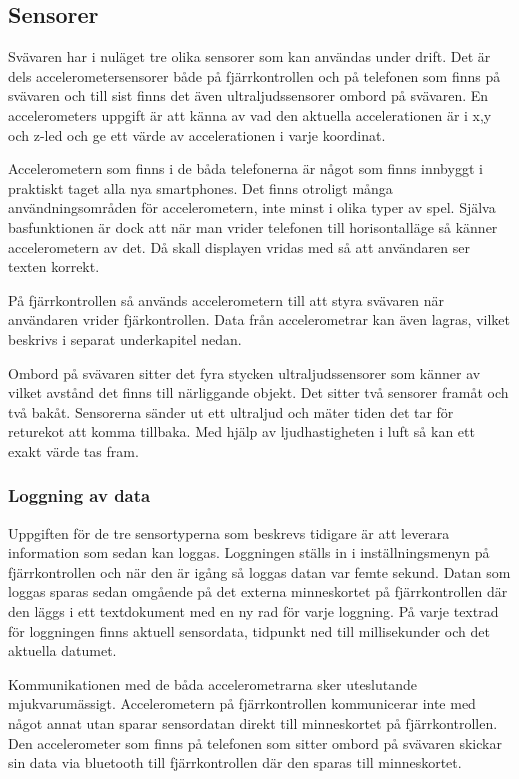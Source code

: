 \subsection{Sensorer}
Svävaren har i nuläget tre olika sensorer som kan användas under drift. Det är dels accelerometersensorer både 
på fjärrkontrollen och på telefonen som finns på svävaren och till sist finns det även ultraljudssensorer ombord på 
svävaren. En accelerometers uppgift är att känna av vad den aktuella accelerationen är i x,y och z-led och ge ett värde 
av accelerationen i varje koordinat.

Accelerometern som finns i de båda telefonerna är något som finns innbyggt i praktiskt taget alla nya smartphones. 
Det finns otroligt många användningsområden för accelerometern, inte minst i olika typer av spel. 
Själva basfunktionen är dock att när man vrider telefonen till horisontalläge så känner accelerometern av det. 
Då skall displayen vridas med så att användaren ser texten korrekt.

På fjärrkontrollen så används accelerometern till att styra svävaren när
användaren vrider fjärkontrollen.
Data från accelerometrar kan även lagras, vilket beskrivs i separat
underkapitel nedan.

Ombord på svävaren sitter det fyra stycken ultraljudssensorer som känner av vilket avstånd det finns till närliggande 
objekt. Det sitter två sensorer framåt och två bakåt. Sensorerna sänder ut ett ultraljud och mäter tiden det tar för 
returekot att komma tillbaka. Med hjälp av ljudhastigheten i luft så kan ett exakt värde tas fram.

\subsubsection{Loggning av data}
Uppgiften för de tre sensortyperna som beskrevs tidigare är att leverara information som sedan kan loggas. 
Loggningen ställs in i inställningsmenyn på fjärrkontrollen och när den är igång så loggas datan var femte sekund. 
Datan som loggas sparas sedan omgående på det externa minneskortet på fjärrkontrollen där den läggs i ett textdokument 
med en ny rad för varje loggning. På varje textrad för loggningen finns aktuell sensordata, tidpunkt ned till 
millisekunder och det aktuella datumet.

Kommunikationen med de båda accelerometrarna sker uteslutande mjukvarumässigt. Accelerometern på fjärrkontrollen 
kommunicerar inte med något annat utan sparar sensordatan direkt till minneskortet på fjärrkontrollen. 
Den accelerometer som finns på telefonen som sitter ombord på svävaren skickar sin data via bluetooth till fjärrkontrollen 
där den sparas till minneskortet.

